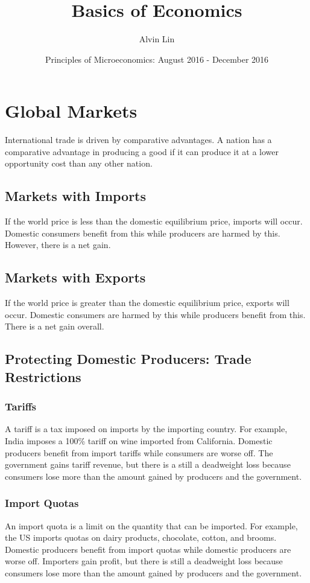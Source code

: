 \documentclass[letterpaper, 12pt]{article}
\title{Basics of Economics}
\author{Alvin Lin}
\date{Principles of Microeconomics: August 2016 - December 2016}
\begin{document}
\maketitle

\section{Global Markets}
International trade is driven by comparative advantages. A nation has a
comparative advantage in producing a good if it can produce it at a lower
opportunity cost than any other nation.

\subsection{Markets with Imports}
If the world price is less than the domestic equilibrium price, imports will
occur. Domestic consumers benefit from this while producers are harmed by this.
However, there is a net gain.

\subsection{Markets with Exports}
If the world price is greater than the domestic equilibrium price, exports will
occur. Domestic consumers are harmed by this while producers benefit from this.
There is a net gain overall.

\subsection{Protecting Domestic Producers: Trade Restrictions}

\subsubsection{Tariffs}
A tariff is a tax imposed on imports by the importing country. For example,
India imposes a 100\% tariff on wine imported from California. Domestic
producers benefit from import tariffs while consumers are worse off. The
government gains tariff revenue, but there is a still a deadweight loss
because consumers lose more than the amount gained by producers and the
government.

\subsubsection{Import Quotas}
An import quota is a limit on the quantity that can be imported. For example,
the US imports quotas on dairy products, chocolate, cotton, and brooms.
Domestic producers benefit from import quotas while domestic producers are
worse off. Importers gain profit, but there is still a deadweight loss because
consumers lose more than the amount gained by producers and the government.
\end{document}
